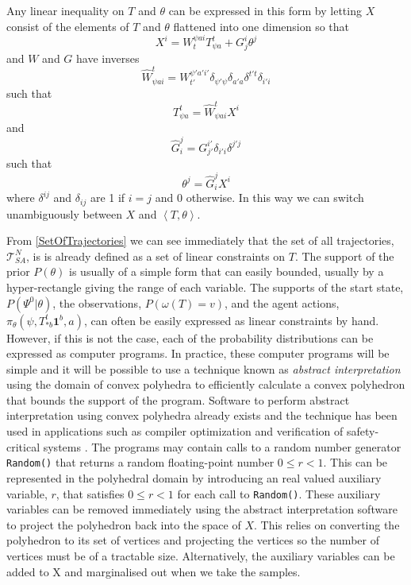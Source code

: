 \documentclass{article}
\begin{document}
Any linear inequality on $T$ and $\theta$ can be expressed in this form by letting $X$ consist of the elements of $T$ and $\theta$ flattened into one dimension so that
\[
X^i = W^{\psi a i}_{t}T^t_{\psi a} + G^i_j\theta^j
\]
and $W$ and $G$ have inverses
\[
\hat{W}^t_{\psi a i} = W^{\psi' a' i'}_{t'}\delta_{\psi'\psi}\delta_{a'a}\delta^{t't}\delta_{i'i}
\]
such that
\[
T^t_{\psi a} = \hat{W}^{t}_{\psi a i}X^i
\]
and
\[
\hat{G}^j_i = G^{i'}_{j'}\delta_{i'i}\delta^{j'j}
\]
such that
\[
\theta^j = \hat{G}^{j}_{i} X^i
\]
where $\delta^{ij}$ and $\delta_{ij}$ are 1 if $i=j$ and 0 otherwise. In this way we can switch unambiguously between $X$ and $\left<T,\theta\right>$.

From \eqref{SetOfTrajectories} we can see immediately that the set of all trajectories, $\mathcal{T}^N_{SA}$, is is already defined as a set of linear constraints on $T$. The support of the prior $P(\theta)$ is usually of a simple form that can easily bounded, usually by a hyper-rectangle giving the range of each variable. The supports of the start state, $P(\Psi^0|\theta)$, the observations, $P(\omega(T)=v)$, and the agent actions, $\pi_\theta(\psi,T^t_{*b}\mathbf{1}^b,a)$, can often be easily expressed as linear constraints by hand. However, if this is not the case, each of the probability distributions can be expressed as computer programs. In practice, these computer programs will be simple and it will be possible to use a technique known as \textit{abstract interpretation} \citep{cousot1977abstract} using the domain of convex polyhedra \citep*{cousot1978automatic, becchi2018efficient, fukuda2020polyhedral} to efficiently calculate a convex polyhedron that bounds the support of the program. Software to perform abstract interpretation using convex polyhedra already exists \citep*{henry2012pagai, GN2021, jeannet2009apron, bagnara2008parma} and the technique has been used in applications such as compiler optimization \citep{nsjodin2009design} and verification of safety-critical systems \citep{halbwachs1997verification}. The programs may contain calls to a random number generator \texttt{Random()} that returns a random floating-point number $0 \le r < 1$. This can be represented in the polyhedral domain by introducing an real valued auxiliary variable, $r$, that satisfies $0 \le r < 1$ for each call to \texttt{Random()}. These auxiliary variables can be removed immediately using the abstract interpretation software to project the polyhedron back into the space of $X$. This relies on converting the polyhedron to its set of vertices \citep{motzkin1953double} and projecting the vertices so the number of vertices must be of a tractable size. Alternatively, the auxiliary variables can be added to X and marginalised out when we take the samples.
\end{document}
